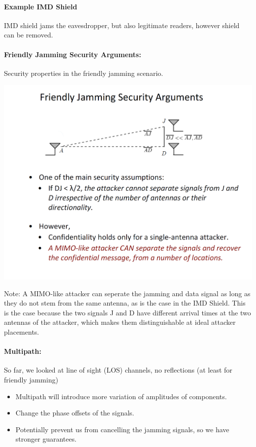 \paragraph{Example IMD Shield}
IMD shield jams the eavesdropper, but also legitimate readers, however shield can be removed.

\paragraph{Friendly Jamming Security Arguments:} 
Security properties in the friendly jamming scenario.

\begin{minipage}{\linewidth}
    \centering      
    \includegraphics[width=\linewidth]{Figures/L7_friendly_jamming_security.PNG} 
\end{minipage}

Note: A MIMO-like attacker can seperate the jamming and data signal as long as they do not stem from the same antenna, as is the case in the IMD Shield. This is the case because the two signals J and D have different arrival times at the two antennas of the attacker, which makes them distinguishable at ideal attacker placements.

\paragraph{Multipath:} So far, we looked at line of sight (LOS) channels, no reflections (at least for friendly jamming) 
\begin{itemize}
    \item Multipath will introduce more variation of amplitudes of components.
    \item Change the phase offsets of the signals.
    \item Potentially prevent us from cancelling the jamming signals, so we have stronger guarantees.
\end{itemize}

